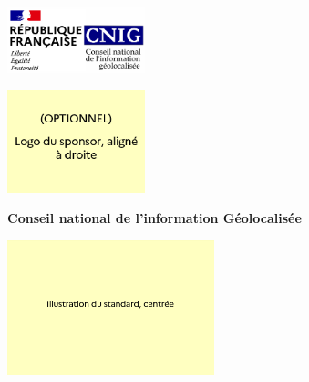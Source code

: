 \documentclass[a4paper,12pt]{article}
\begin{document}
\begin{titlepage}
    \centering

    \begin{minipage}{0.45\textwidth}
        \raggedright
        \includegraphics[width=4cm]{./ressources/logo_cnig.png}
    \end{minipage}
    \hfill
    \begin{minipage}{0.45\textwidth}
        \raggedleft
        \includegraphics[width=4cm]{./ressources/logo_sponsor.PNG} %
    \end{minipage}

    \vspace{1cm} 

    {\Huge\bfseries Conseil national de l'information Géolocalisée\par}

    \vspace{1cm} 

    \includegraphics[width=6cm]{./ressources/illustration_standard.PNG} %

    \vspace{1cm} 


\end{titlepage}
\end{document}
